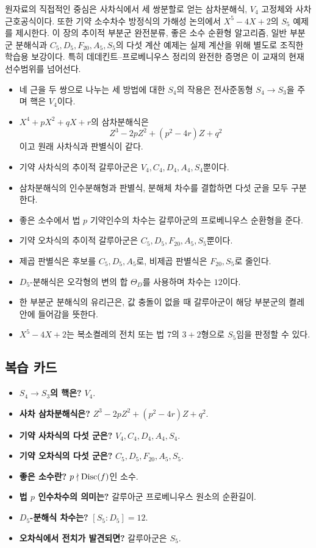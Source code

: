\begin{remark}[원자료와 이 장의 보강 범위]
원자료의 직접적인 중심은 사차식에서 세 쌍분할로 얻는 삼차분해식, $V_4$ 고정체와 사차 근호공식이다. 또한 기약 소수차수 방정식의 가해성 논의에서 $X^5-4X+2$의 $S_5$ 예제를 제시한다. 이 장의 추이적 부분군 완전분류, 좋은 소수 순환형 알고리즘, 일반 부분군 분해식과 $C_5,D_5,F_{20},A_5,S_5$의 다섯 계산 예제는 실제 계산을 위해 별도로 조직한 학습용 보강이다. 특히 데데킨트--프로베니우스 정리의 완전한 증명은 이 교재의 현재 선수범위를 넘어선다.
\end{remark}

\begin{chapterreview}
\begin{itemize}
  \item 네 근을 두 쌍으로 나누는 세 방법에 대한 $S_4$의 작용은 전사준동형 $S_4\to S_3$을 주며 핵은 $V_4$이다.
  \item $X^4+pX^2+qX+r$의 삼차분해식은
  \[
    Z^3-2pZ^2+(p^2-4r)Z+q^2
  \]
  이고 원래 사차식과 판별식이 같다.
  \item 기약 사차식의 추이적 갈루아군은 $V_4,C_4,D_4,A_4,S_4$뿐이다.
  \item 삼차분해식의 인수분해형과 판별식, 분해체 차수를 결합하면 다섯 군을 모두 구분한다.
  \item 좋은 소수에서 법 $p$ 기약인수의 차수는 갈루아군의 프로베니우스 순환형을 준다.
  \item 기약 오차식의 추이적 갈루아군은 $C_5,D_5,F_{20},A_5,S_5$뿐이다.
  \item 제곱 판별식은 후보를 $C_5,D_5,A_5$로, 비제곱 판별식은 $F_{20},S_5$로 줄인다.
  \item $D_5$-분해식은 오각형의 변의 합 $\Theta_D$를 사용하며 차수는 $12$이다.
  \item 한 부분군 분해식의 유리근은, 값 충돌이 없을 때 갈루아군이 해당 부분군의 켤레 안에 들어감을 뜻한다.
  \item $X^5-4X+2$는 복소켤레의 전치 또는 법 $7$의 $3+2$형으로 $S_5$임을 판정할 수 있다.
\end{itemize}
\end{chapterreview}

\subsection*{복습 카드}

\begin{itemize}
  \item \textbf{$S_4\to S_3$의 핵은?} $V_4$.
  \item \textbf{사차 삼차분해식은?} $Z^3-2pZ^2+(p^2-4r)Z+q^2$.
  \item \textbf{기약 사차식의 다섯 군은?} $V_4,C_4,D_4,A_4,S_4$.
  \item \textbf{기약 오차식의 다섯 군은?} $C_5,D_5,F_{20},A_5,S_5$.
  \item \textbf{좋은 소수란?} $p\nmid\operatorname{Disc}(f)$인 소수.
  \item \textbf{법 $p$ 인수차수의 의미는?} 갈루아군 프로베니우스 원소의 순환길이.
  \item \textbf{$D_5$-분해식 차수는?} $[S_5:D_5]=12$.
  \item \textbf{오차식에서 전치가 발견되면?} 갈루아군은 $S_5$.
\end{itemize}
